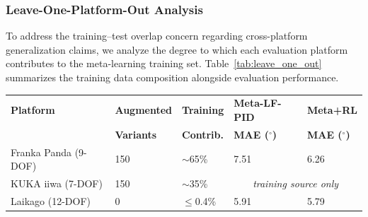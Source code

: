 \documentclass[DTMColor]{ROB-New}
\begin{document}
{\color{blue}
\subsubsection{Leave-One-Platform-Out Analysis}
\label{sec:leave_one_out}

To address the training--test overlap concern regarding cross-platform generalization claims, we analyze the degree to which each evaluation platform contributes to the meta-learning training set. Table~\ref{tab:leave_one_out} summarizes the training data composition alongside evaluation performance.
}

\begin{table}[htbp]
{\begin{fntable}\centering
\begin{tabular}{@{\extracolsep{\fill}}lllll}
\hline
\textbf{Platform} & \textbf{Augmented} & \textbf{Training} & \textbf{Meta-LF-PID} & \textbf{Meta+RL} \\
& \textbf{Variants} & \textbf{Contrib.} & \textbf{MAE ($^\circ$)} & \textbf{MAE ($^\circ$)} \\
\hline
Franka Panda (9-DOF) & 150 & $\sim$65\% & 7.51 & 6.26 \\
KUKA iiwa (7-DOF) & 150 & $\sim$35\% & \multicolumn{2}{c}{\textit{training source only}} \\
Laikago (12-DOF) & 0 & $\leq$0.4\% & 5.91 & 5.79 \\
\hline
\end{tabular}
\end{fntable}}
\end{table}
\end{document}
